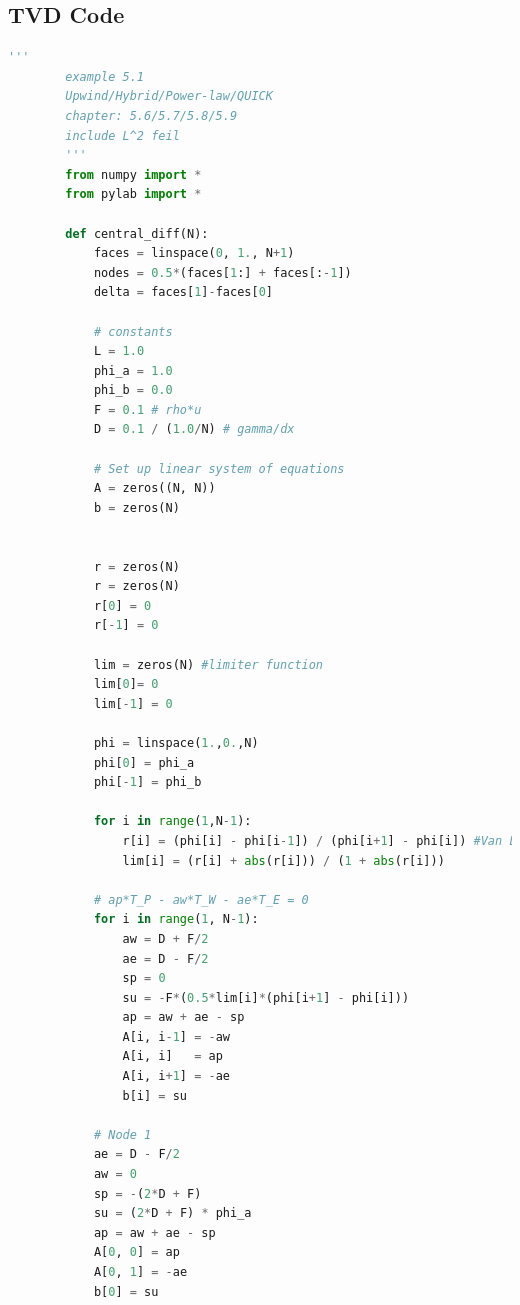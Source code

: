 \documentclass[paper=a4, fontsize=11pt]{article} %
\numberwithin{equation}{section} %
\numberwithin{figure}{section} %
\numberwithin{table}{section} %
\begin{document}
    \subsection{TVD Code}
    \lstset{frame=tb,
    language=Python,
    breaklines=true,
    showstringspaces=false,
    columns=flexible,
    numbers=none,
    tabsize=4
    }
    \begin{center}
        
        \begin{lstlisting}[language=Python, captionpos = b, caption=Source code for excercise 1]
        '''
        example 5.1
        Upwind/Hybrid/Power-law/QUICK
        chapter: 5.6/5.7/5.8/5.9
        include L^2 feil
        '''
        from numpy import *
        from pylab import *

        def central_diff(N):
            faces = linspace(0, 1., N+1)
            nodes = 0.5*(faces[1:] + faces[:-1])
            delta = faces[1]-faces[0]

            # constants
            L = 1.0
            phi_a = 1.0
            phi_b = 0.0
            F = 0.1 # rho*u
            D = 0.1 / (1.0/N) # gamma/dx

            # Set up linear system of equations
            A = zeros((N, N))
            b = zeros(N)
            

            r = zeros(N)
            r = zeros(N)
            r[0] = 0
            r[-1] = 0

            lim = zeros(N) #limiter function
            lim[0]= 0
            lim[-1] = 0

            phi = linspace(1.,0.,N) 
            phi[0] = phi_a
            phi[-1] = phi_b

            for i in range(1,N-1):
                r[i] = (phi[i] - phi[i-1]) / (phi[i+1] - phi[i]) #Van Leer limiter
                lim[i] = (r[i] + abs(r[i])) / (1 + abs(r[i]))
            
            # ap*T_P - aw*T_W - ae*T_E = 0
            for i in range(1, N-1):
                aw = D + F/2
                ae = D - F/2
                sp = 0
                su = -F*(0.5*lim[i]*(phi[i+1] - phi[i]))
                ap = aw + ae - sp
                A[i, i-1] = -aw
                A[i, i]   = ap
                A[i, i+1] = -ae
                b[i] = su

            # Node 1
            ae = D - F/2
            aw = 0
            sp = -(2*D + F)
            su = (2*D + F) * phi_a
            ap = aw + ae - sp
            A[0, 0] = ap
            A[0, 1] = -ae
            b[0] = su


\end{lstlisting}
\end{center}
\end{document}
